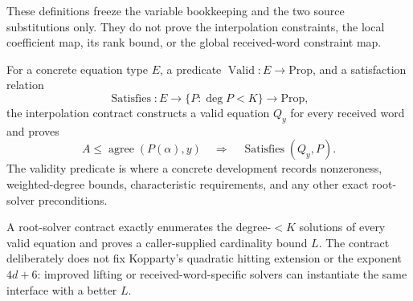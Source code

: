 \begin{theorem}
  \label{thm:hidden_derivative_normalized_substitution_comp}
  \leanok
\end{theorem}

These definitions freeze the variable bookkeeping and the two source substitutions only.  They do
not prove the interpolation constraints, the local coefficient map, its rank bound, or the global
received-word constraint map.

For a concrete equation type $E$, a predicate $\operatorname{Valid}:E\to\mathrm{Prop}$, and a
satisfaction relation
\[
  \operatorname{Satisfies}:E\to\{P:\deg P<K\}\to\mathrm{Prop},
\]
the interpolation contract constructs a valid equation $Q_y$ for every received word and proves
\[
  A\le\operatorname{agree}(P(\alpha),y)
  \quad\Longrightarrow\quad
  \operatorname{Satisfies}(Q_y,P).
\]
The validity predicate is where a concrete development records nonzeroness, weighted-degree bounds,
characteristic requirements, and any other exact root-solver preconditions.

\begin{definition}
  \label{def:hidden_derivative_interpolation_contract}
  \leanok
\end{definition}

A root-solver contract exactly enumerates the degree-$<K$ solutions of every valid equation and
proves a caller-supplied cardinality bound $L$.  The contract deliberately does not fix Kopparty's
quadratic hitting extension or the exponent $4d+6$: improved lifting or received-word-specific
solvers can instantiate the same interface with a better $L$.

\begin{definition}
  \label{def:hidden_derivative_root_solver_contract}
  \leanok
\end{definition}

\begin{theorem}
  \label{thm:hidden_derivative_conditional_decoder}
  \leanok
\end{theorem}

